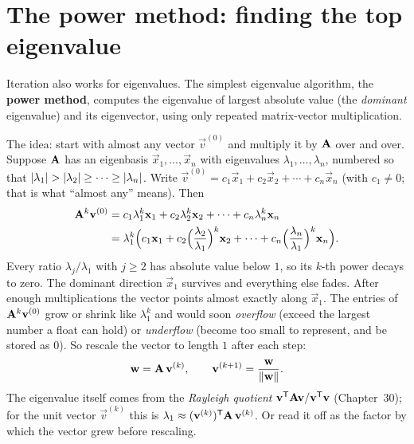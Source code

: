 \section{The power method: finding the top eigenvalue}

Iteration also works for eigenvalues. The simplest eigenvalue algorithm, the
\textbf{power method}, computes the eigenvalue of largest absolute value (the
\emph{dominant} eigenvalue) and its eigenvector, using only repeated matrix-vector
multiplication.

The idea: start with almost any vector $\vec{v}^{(0)}$ and multiply it by $\mathbf{A}$ over
and over. Suppose $\mathbf{A}$ has an eigenbasis $\vec{x}_1,\ldots,\vec{x}_n$ with
eigenvalues $\lambda_1,\ldots,\lambda_n$, numbered so that
$\lvert\lambda_1\rvert > \lvert\lambda_2\rvert\ge\cdots\ge\lvert\lambda_n\rvert$. Write
$\vec{v}^{(0)} = c_1\vec{x}_1 + c_2\vec{x}_2 + \cdots + c_n\vec{x}_n$ (with $c_1\ne 0$;
that is what ``almost any'' means). Then
\[
  \begin{aligned}
  \mathbf{A}^k\mathbf{v}^{(0)} &= c_1\lambda_1^k\mathbf{x}_1 + c_2\lambda_2^k\mathbf{x}_2 + \cdots
     + c_n\lambda_n^k\mathbf{x}_n\\
   &= \lambda_1^k\Bigl(c_1\mathbf{x}_1 + c_2\Bigl(\frac{\lambda_2}{\lambda_1}\Bigr)^{k}\mathbf{x}_2
     + \cdots + c_n\Bigl(\frac{\lambda_n}{\lambda_1}\Bigr)^{k}\mathbf{x}_n\Bigr).
  \end{aligned}
\]
Every ratio $\lambda_j/\lambda_1$ with $j\ge 2$ has absolute value below $1$, so its
$k$-th power decays to zero. The dominant direction $\vec{x}_1$ survives and everything
else fades. After enough multiplications the vector points almost exactly along
$\vec{x}_1$. The entries of $\mathbf{A}^k\mathbf{v}^{(0)}$ grow or shrink like $\lambda_1^k$
and would soon \emph{overflow} (exceed the largest number a float can hold) or
\emph{underflow} (become too small to represent, and be stored as $0$). So rescale the
vector to length $1$ after each step:
\[
  \mathbf{w} = \mathbf{A}\,\mathbf{v}^{(k)}, \qquad
  \mathbf{v}^{(k+1)} = \frac{\mathbf{w}}{\lVert\mathbf{w}\rVert}.
\]
The eigenvalue itself comes from the \emph{Rayleigh quotient}
$\mathbf{v}^{\mathsf{T}}\mathbf{A}\mathbf{v}/\mathbf{v}^{\mathsf{T}}\mathbf{v}$ (Chapter~30); for the unit vector
$\vec{v}^{(k)}$ this is $\lambda_1 \approx (\mathbf{v}^{(k)})^{\mathsf{T}}\mathbf{A}\,\mathbf{v}^{(k)}$. Or
read it off as the factor by which the vector grew before rescaling.


